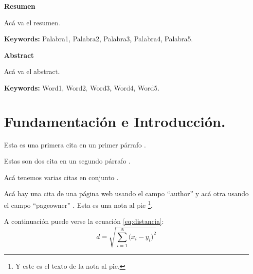 

\pagestyle{fancy}
\fancyhead{}
\fancyfoot{}
\fancyfoot[R]{\thepage}

\tableofcontents %
\newpage %

\begin{flushleft} 
	\fontsize{14pt}{17pt}\selectfont
	\textbf{Resumen}
\end{flushleft}

Acá va el resumen.\par

\begin{footnotesize}
	\textbf{Keywords:} Palabra1, Palabra2, Palabra3, Palabra4, Palabra5.
\end{footnotesize}

\begin{flushleft} 
	\fontsize{14pt}{17pt}\selectfont
	\textbf{Abstract}
\end{flushleft}

Acá va el  abstract.\par

\begin{footnotesize}
	\textbf{Keywords:} Word1, Word2, Word3, Word4, Word5.
\end{footnotesize}


\newpage


\section{Fundamentación e Introducción.}
Esta es una primera cita en un primer párrafo \cite{Repp2005}.\par
Estas son dos cita en un segundo párrafo \cite{Grootswager2020, Geronazzo2014}.\par
Acá tenemos varias citas en conjunto \cite{Gallant2019, Bridges2020, Anwyl2020, Pronk2020}. \par
Acá hay una cita de una página web usando el campo “author” \cite{Warusfel2002} y acá otra usando el campo “pageowner” \cite{KEMAR}.
Esta es una nota al pie \footnote{Y este es el texto de la nota al pie.}.\par
A continuación puede verse la ecuación \eqref{eq:distancia}:
\begin{equation}\label{eq:distancia}
	d = \sqrt{\sum_{i=1}^{N}{(x_i -y_i})^2 }
\end{equation}

